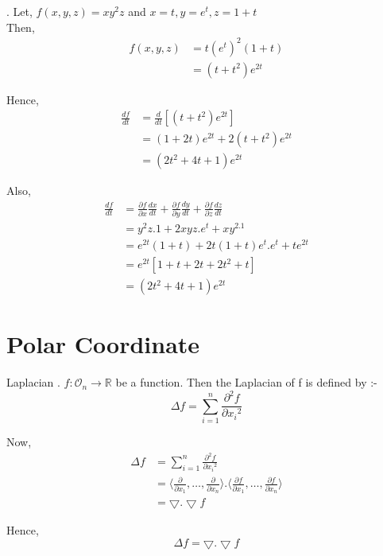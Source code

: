\documentclass[Analysis-3]{subfiles}
\begin{document}
\begin{Eg}{}
	. Let, $f(x,y,z) = xy^{2}z$ and $x=t, y=e^t, z= 1+t$ \\
	Then, \begin{align*}
		f(x,y,z) &= t(e^t)^2(1+t)\\
		&= (t+t^2)e^{2t}
	\end{align*}

Hence, \begin{align*}
	\frac{df}{dt} &= \frac{d}{dt}[(t+t^2)e^{2t}] \\
	&= (1+2t)e^{2t} + 2(t+t^2)e^{2t}\\
	&= (2t^2+4t+1)e^{2t} 
\end{align*}

Also, \begin{align*}
	\frac{df}{dt} &= \frac{\partial f}{\partial x} \frac{dx}{dt} + \frac{\partial f}{\partial y} \frac{dy}{dt} + \frac{\partial f}{\partial z} \frac{dz}{dt} \\
	&= y^2z . 1 + 2xyz.e^t + xy^2.1 \\
	&= e^{2t}(1+t) + 2t(1+t)e^t.e^t + te^{2t} \\
	&= e^{2t}[1+t+2t+2t^2+t] \\
	&= (2t^2+4t+1)e^{2t}
\end{align*}

\end{Eg}


\section{Polar Coordinate}

\begin{Def}{Laplacian}
	. $f : \mathcal{O}_n \to \mathbb{R}$ be a function. Then the Laplacian of f is defined by :- \[ \Delta f = \sum_{i = 1}^{n} \frac{\partial^2 f}{ \partial {x_i}^2}   \]
\end{Def}

Now, \begin{align*}
	\Delta f &= \sum_{i = 1}^{n} \frac{\partial^2 f}{ \partial {x_i}^2} \\
	&= \langle \frac{\partial}{\partial x_1}, \ldots, \frac{\partial}{\partial x_n}  \rangle . \langle \frac{\partial f}{\partial x_1}, \ldots, \frac{\partial f}{\partial x_n}  \rangle \\
	&= \bigtriangledown . \bigtriangledown f 
\end{align*}

Hence, \[\boxed{\Delta f = \bigtriangledown . \bigtriangledown f}\]
\end{document}
